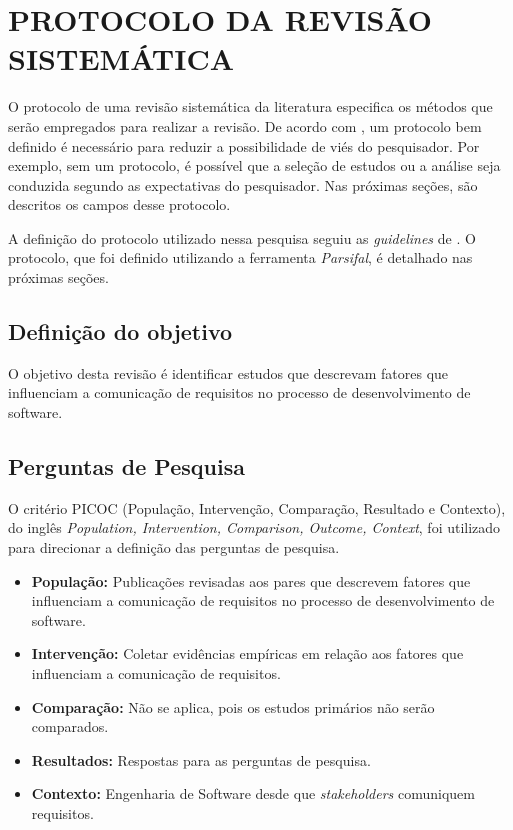 
\chapter{PROTOCOLO DA REVISÃO SISTEMÁTICA}
\label{sec:protocolo}       

O protocolo de uma revisão sistemática da literatura especifica os métodos que serão empregados para realizar a revisão. De acordo com \cite{kitchenham}, um protocolo bem definido é necessário para reduzir a possibilidade de viés do pesquisador. Por exemplo, sem um protocolo, é possível que a seleção de
estudos ou a análise seja conduzida segundo as expectativas do pesquisador. Nas próximas seções, são descritos os campos desse protocolo.

A definição do protocolo utilizado nessa pesquisa seguiu as \textit{guidelines} de \cite{kitchenham}. O protocolo, que foi definido utilizando a ferramenta \textit{Parsifal}, é detalhado nas próximas seções.

\section{Definição do objetivo} 
    
O objetivo desta revisão é identificar estudos que descrevam fatores que influenciam a comunicação de requisitos no processo de desenvolvimento de software.


\section{Perguntas de Pesquisa} \label{sec:RQs}


O critério PICOC (População, Intervenção, Comparação, Resultado e Contexto), do inglês \emph{Population, Intervention, Comparison, Outcome, Context}, foi utilizado para direcionar a definição das perguntas de pesquisa. 

\begin{itemize}
\item\textbf{População:} Publicações revisadas aos pares que descrevem fatores que influenciam a comunicação de requisitos no processo de desenvolvimento de software.
\item\textbf {Intervenção:} Coletar evidências empíricas em relação aos fatores que influenciam a comunicação de requisitos.
\item\textbf {Comparação:} Não se aplica, pois os estudos primários não serão comparados. 
\item\textbf {Resultados:} Respostas para as perguntas de pesquisa.
\item\textbf {Contexto:} Engenharia de Software desde que \emph{stakeholders} comuniquem requisitos.
\end{itemize}

